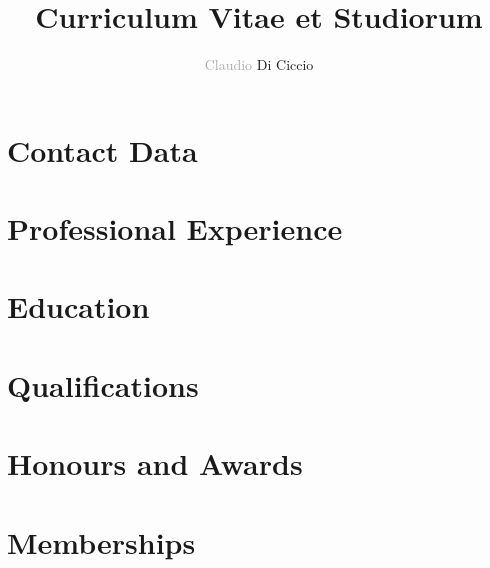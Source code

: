 \documentclass[10pt,a4paper]{article}
\author{\textcolor{darkgray}{Claudio} Di Ciccio}
\title{Curriculum Vitae et Studiorum}
\newif\ifkeyoutputs
\begin{document}
%
\maketitle
%





%
\section*{Contact Data}

\section*{Professional Experience}


\section*{Education}


\section*{Qualifications}


\section*{Honours and Awards}










\newpage
{}




\ifkeyoutputs{%
\section*{Seven Key Outputs}

\newpage
}%
\fi




\section*{Memberships}%

\end{document}
